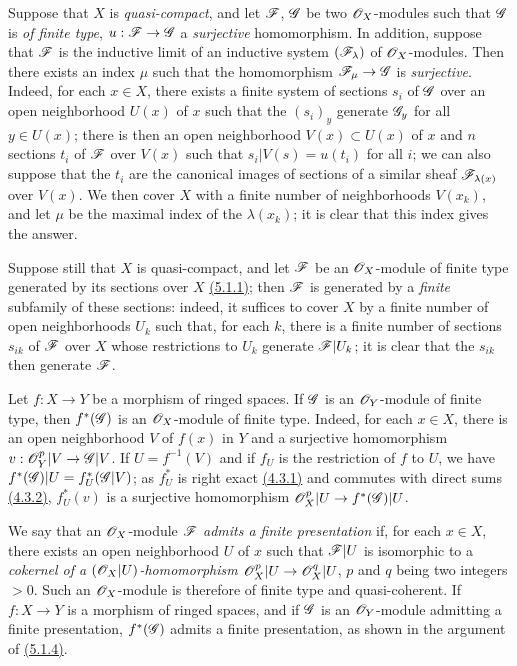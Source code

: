 \begin{env}[5.2.3]
\label{env-0.5.2.3}
Suppose that $X$ is {\em quasi-compact}, and let $\mathscr{F}$, $\mathscr{G}$ be two $\mathscr{O}_X$-modules
such that $\mathscr{G}$ is {\em of finite type}, $u:\mathscr{F}\to\mathscr{G}$ a {\em surjective}
homomorphism. In addition, suppose that $\mathscr{F}$ is the inductive limit of an inductive
system $(\mathscr{F}_\lambda)$ of $\mathscr{O}_X$-modules. Then there exists an index $\mu$ such that the
homomorphism $\mathscr{F}_\mu\to\mathscr{G}$ is {\em surjective}. Indeed, for each $x\in X$, there
exists a finite system of sections $s_i$ of $\mathscr{G}$ over an open neighborhood $U(x)$ of $x$
such that the $(s_i)_y$ generate $\mathscr{G}_y$ for all $y\in U(x)$; there is then an open
neighborhood $V(x)\subset U(x)$ of $x$ and $n$ sections $t_i$ of $\mathscr{F}$ over $V(x)$ such
that $s_i|V(s)=u(t_i)$ for all $i$; we can also suppose that the $t_i$ are the canonical
images of sections of a similar sheaf $\mathscr{F}_{\lambda(x)}$ over $V(x)$. We then cover $X$
with a finite number of neighborhoods $V(x_k)$, and let $\mu$ be the maximal index of the
$\lambda(x_k)$; it is clear that this index gives the answer.

Suppose still that $X$ is quasi-compact, and let $\mathscr{F}$ be an $\mathscr{O}_X$-module of finite type
generated by its sections over $X$ \hyperref[env-0.5.1.1]{(5.1.1)}; then $\mathscr{F}$ is generated by a
{\em finite} subfamily of these sections: indeed, it suffices to cover $X$ by a finite
number of open neighborhoods $U_k$ such that, for each $k$, there is a finite number of
sections $s_{ik}$ of $\mathscr{F}$ over $X$ whose restrictions to $U_k$ generate $\mathscr{F}|U_k$; it
is clear that the $s_{ik}$ then generate $\mathscr{F}$.
\end{env}

\begin{env}[5.2.4]
\label{env-0.5.2.4}
Let $f:X\to Y$ be a morphism of ringed spaces. If $\mathscr{G}$ is an $\mathscr{O}_Y$-module of finite
type, then $f^*(\mathscr{G})$ is an $\mathscr{O}_X$-module of finite type. Indeed, for each $x\in X$,
there is an open neighborhood $V$ of $f(x)$ in $Y$ and a surjective homomorphism
$v:\mathscr{O}_Y^p|V\to\mathscr{G}|V$. If $U=f^{-1}(V)$ and if $f_U$ is the restriction of $f$ to $U$, we
have $f^*(\mathscr{G})|U=f_U^*(\mathscr{G}|V)$; as $f_U^*$ is right exact \hyperref[env-0.4.3.1]{(4.3.1)} and
commutes with direct sums \hyperref[env-0.4.3.2]{(4.3.2)}, $f_U^*(v)$ is a surjective homomorphism
$\mathscr{O}_X^p|U\to f^*(\mathscr{G})|U$.
\end{env}

\begin{env}[5.2.5]
\label{env-0.5.2.5}
We say that an $\mathscr{O}_X$-module $\mathscr{F}$ {\em admits a finite presentation} if, for each
$x\in X$, there exists an open neighborhood $U$ of $x$ such that $\mathscr{F}|U$ is isomorphic
to a {\em cokernel of a $(\mathscr{O}_X|U)$-homomorphism $\mathscr{O}_X^p|U\to\mathscr{O}_X^q|U$}, $p$ and $q$ being
two integers $>0$. Such an $\mathscr{O}_X$-module is therefore of finite type and quasi-coherent. If
$f:X\to Y$ is a morphism of ringed spaces, and if $\mathscr{G}$ is an $\mathscr{O}_Y$-module admitting a
finite presentation, $f^*(\mathscr{G})$ admits a finite presentation, as shown in the argument of
\hyperref[env-0.5.1.4]{(5.1.4)}.
\end{env}

